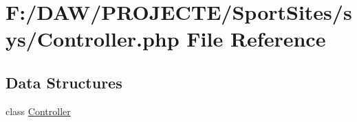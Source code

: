 \hypertarget{_controller_8php}{}\section{F\+:/\+D\+A\+W/\+P\+R\+O\+J\+E\+C\+T\+E/\+Sport\+Sites/sys/\+Controller.php File Reference}
\label{_controller_8php}
\subsection*{Data Structures}
\begin{DoxyCompactItemize}
\item 
class \hyperlink{class_controller}{Controller}
\end{DoxyCompactItemize}
